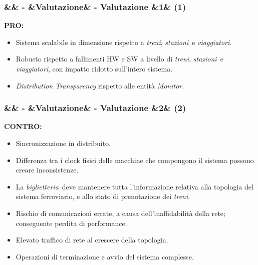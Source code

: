 \documentclass[slidestop,compress,blackandwhite]{beamer}
\newcommand{\ii}[1]{\textit{#1}}
\newcommand{\treni}{\ii{treni}}
\newcommand{\viaggiatori}{\ii{viaggiatori}}
\newcommand{\stazioni}{\ii{stazioni}}
\newcommand{\biglietteria}{\ii{biglietteria}}
\newcommand{\PRO}{\textbf{PRO:}}
\newcommand{\CONTRO}{\textbf{CONTRO:}}
\newcommand{\newtitle}[4]{
	#1 
	\ifx&#2&%
	\else
  		\large- #2
	\fi
	\ifx&#3&%
	\else
  		\normalsize- #3
	\fi
	\ifx&#4&%
	\else
  		\normalsize (#4)
	\fi
}
\newcommand{\newframe}[5]{
	\begin{frame}
		\frametitle{\newtitle{#1}{#2}{#3}{#4}}
		#5
	\end{frame}
}
\begin{document}
			
	
	\newframe{}{}{Valutazione}{1}{
		\PRO
			\vspace{0.5cm}
			\begin{itemize}
				\item Sistema scalabile in dimensione rispetto a \treni, \stazioni~e \viaggiatori.
				\vspace{0.5cm}
				\item Robusto rispetto a fallimenti HW e SW a livello di \treni, \stazioni~e \viaggiatori, con impatto ridotto sull'intero sistema.
				\vspace{0.5cm}
				\item \ii{Distribution Transparency} rispetto alle entità \ii{Monitor}.
			\end{itemize}
		
	}

	\newframe{}{}{Valutazione}{2}{
		\CONTRO
			\begin{itemize}
				\item Sincronizzazione in distribuito.
				\item Differenza tra i clock fisici delle macchine che compongono il sistema possono creare inconsistenze.
				\item La \biglietteria~deve mantenere tutta l'informazione relativa alla topologia del sistema ferroviario, e allo stato di prenotazione dei \treni.
				\item Rischio di comunicazioni errate, a causa dell'inaffidabilità della rete; conseguente perdita di performance. 
				\item Elevato traffico di rete al crescere della topologia.
				\item Operazioni di terminazione e avvio del sistema complesse.
			\end{itemize}
	}
	
\end{document}
